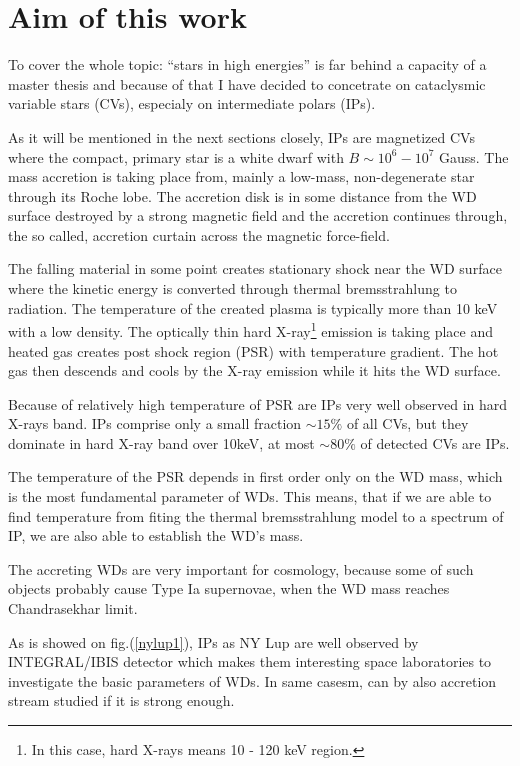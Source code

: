 \documentclass[oneside,a4paper,11pt]{report}
\begin{document}
\section{Aim of this work}
To cover the whole topic: ``stars in high energies'' is far behind a capacity of a master thesis and because of that I have decided 
to concetrate on cataclysmic variable stars (CVs), especialy on intermediate polars (IPs). 

As it will be mentioned in the next sections closely, IPs are magnetized CVs where the compact, primary star 
is a white dwarf with $B\sim 10^6 -10^7$ Gauss. The mass accretion is taking place from, mainly a low-mass, non-degenerate star through its Roche lobe.  
The accretion disk is in some distance from the WD surface destroyed by a strong magnetic field and 
the accretion continues through, the so called, accretion curtain across the magnetic force-field.

The falling material in some point creates stationary shock near the WD surface where the kinetic energy is converted 
through thermal bremsstrahlung to radiation. The temperature of the created plasma is typically more than 
10 keV with a low density. The optically thin hard X-ray\footnote{In this case, hard X-rays means 10 - 120 keV region.} emission is taking place and heated gas creates 
post shock region (PSR) with temperature gradient. The hot gas then descends and cools by the X-ray 
emission while it hits the WD surface.      

Because of relatively high temperature of PSR are IPs very well observed in hard X-rays band. 
IPs comprise only a small fraction $\sim 15\%$ of all CVs, but they dominate in hard X-ray band over 10keV, at most 
$\sim 80\%$ of detected CVs are IPs\citet{2009MNRAS.392..630L}. 

The temperature of the PSR depends in first order only on the WD mass, which is the most fundamental parameter of WDs.
This means, that if we are able to find temperature from fiting the thermal bremsstrahlung model to a spectrum of IP, 
we are also able to establish the WD's mass. 

The accreting WDs are very important for cosmology, because some of such objects probably cause Type Ia supernovae, 
when the WD mass reaches Chandrasekhar limit. 

As is showed on fig.(\ref{nylup1}), IPs as NY Lup are well observed by INTEGRAL/IBIS detector which makes them 
interesting space laboratories to investigate the basic parameters of WDs. In same casesm, can by also accretion stream studied
if it is strong enough. 
    
\end{document}
